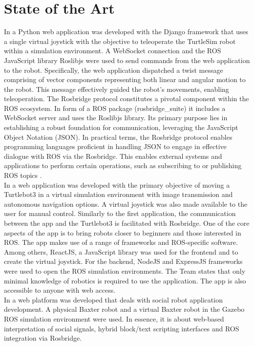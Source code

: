 \documentclass[conference]{IEEEtran}
\begin{document}
\section{State of the Art}
In \cite{kapic} a Python web application was developed with the Django framework that uses a single virtual joystick with the objective to teleoperate the TurtleSim robot within a simulation environment. 
A WebSocket connection and the ROS JavaScript library Roslibjs were used to send commands from the web application to the robot. Specifically, the web application dispatched a twist message comprising of vector components representing both linear and angular motion to the robot. This message effectively guided the robot's movements, enabling teleoperation.
The Rosbridge protocol constitutes a pivotal component within the ROS ecosystem. In form of a ROS package (rosbridge\_suite) it includes a WebSocket server and uses the Roslibjs library. Its primary purpose lies in establishing a robust foundation for communication, leveraging the JavaScript Object Notation (JSON).
In practical terms, the Rosbridge protocol enables programming languages proficient in handling JSON to engage in effective dialogue with ROS via the Rosbridge. 
This enables external systems and applications to perform certain operations, such as subscribing to or publishing ROS topics \cite{rosbridgeOkState} \cite{rosbridgeSuite}.\\
In \cite{dinodi} a web application was developed with the primary objective of moving a Turtlebot3 in a virtual simulation environment with image transmission and autonomous navigation options. A virtual joystick was also made available to the user for manual control. Similarly to the first application, the communication between the app and the Turtlebot3 is facilitated with Rosbridge. 
One of the core aspects of the app is to bring robots closer to beginners and those interested in ROS. 
The app makes use of a range of frameworks and ROS-specific software. Among others, ReactJS, a JavaScript library was used for the frontend and to create the virtual joystick. For the backend, NodeJS and ExpressJS frameworks were used to open the ROS simulation environments. 
The Team states that only minimal knowledge of robotics is required to use the application. The app is also accessible to anyone with web access.\\
In \cite{johnson} a web platform was developed that deals with social robot application development. A physical Baxter robot and a virtual Baxter robot in the Gazebo ROS simulation environment were used. In essence, it is about web-based interpretation of social signals, hybrid block/text scripting interfaces and ROS integration via Rosbridge. 
\end{document}
